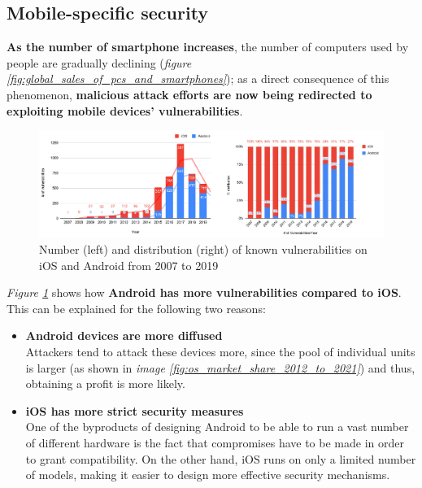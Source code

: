 \subsection{Mobile-specific security}
\textbf{As the number of smartphone increases}, the number of computers used by people are gradually declining (\textit{figure \ref{fig:global_sales_of_pcs_and_smartphones}}); as a direct consequence of this phenomenon, \textbf{malicious attack efforts are now being redirected to exploiting mobile devices' vulnerabilities}.
\begin{figure}[!ht]
    \centering
    \includegraphics[width=\linewidth]{document/chapters/chapter_3/images/mobile_vulnerabilities.jpg}
    \caption{Number (left) and distribution (right) of known vulnerabilities on iOS and Android from 2007 to 2019 \cite{mobile_security}}
    \label{fig:mobile_vulnerabilities}
\end{figure}
\textit{Figure \ref{fig:mobile_vulnerabilities}} shows how \textbf{Android has more vulnerabilities compared to iOS}. This can be explained for the following two reasons:
\begin{itemize}
    \item \textbf{Android devices are more diffused}\\
    Attackers tend to attack these devices more, since the pool of individual units is larger (as shown in \textit{image \ref{fig:os_market_share_2012_to_2021}}) and thus, obtaining a profit is more likely.
    \item \textbf{iOS has more strict security measures} \cite{mobile_security}\\
    One of the byproducts of designing Android to be able to run a vast number of different hardware is the fact that compromises have to be made in order to grant compatibility. On the other hand, iOS runs on only a limited number of models, making it easier to design more effective security mechanisms. 
\end{itemize}
